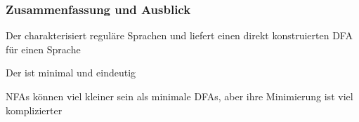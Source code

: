 \documentclass[aspectratio=1610,onlymath]{beamer}
\begin{document}
\begin{frame}\frametitle{Zusammenfassung und Ausblick}

Der  charakterisiert reguläre Sprachen und liefert einen direkt konstruierten DFA für einen Sprache
\bigskip

Der  ist minimal und eindeutig
\bigskip

NFAs können viel kleiner sein als minimale DFAs, aber ihre Minimierung ist viel komplizierter



\end{frame}
\end{document}
